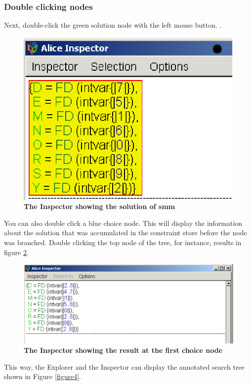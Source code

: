 \documentclass[a4paper,halfparskip]{scrartcl}
\begin{document}
\subsubsection{Double clicking nodes}
Next, double-click the green solution node with the left mouse button.
. 
\begin{figure}[htpb]
\centerline{\includegraphics*[scale=1.0]{figs/inspector1.eps}}
\caption{\textbf{The Inspector showing the solution of smm}}
\label{figure7}
\end{figure}
You can also double click a blue choice node. 
This will display the information about the solution 
that was accumulated in the constraint store before the node was
branched. Double clicking the top node of the tree, for instance, 
results in figure \ref{figure8}.
\begin{figure}[htpb]
\centerline{\includegraphics*[scale=0.8]{figs/inspector2.eps}}
\caption{\textbf{The Inspector showing the result at the first choice node}}
\label{figure8}
\end{figure}
This way, the Explorer and the Inspector can display the 
annotated search tree shown in Figure \ref{figure4}.
\end{document}
